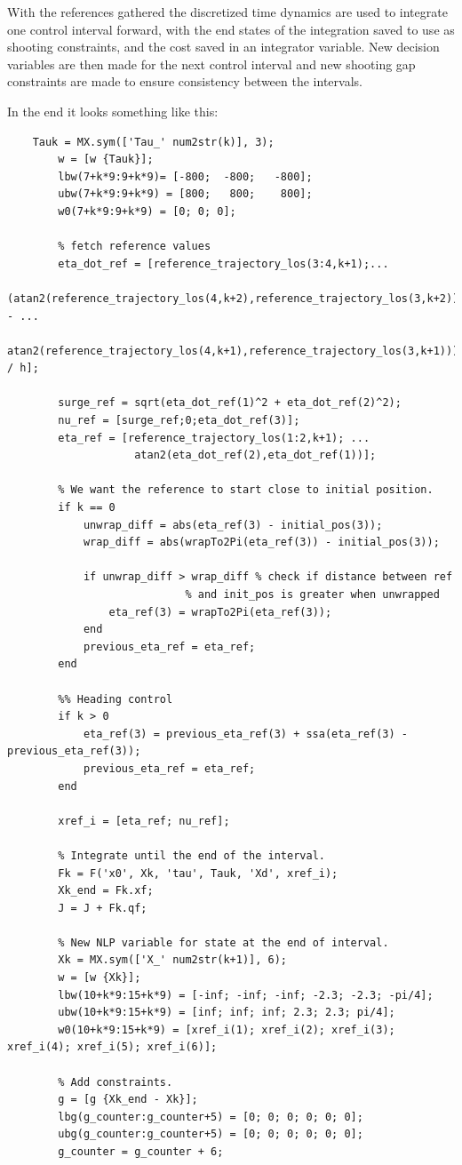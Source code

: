 With the references gathered the discretized time dynamics are used to integrate one control interval forward, with the end states of the integration
saved to use as shooting constraints, and the cost saved in an integrator variable. New decision variables are then made for the next control interval and
new shooting gap constraints are made to ensure consistency between the intervals.

In the end it looks something like this:
\begin{lstlisting}
    Tauk = MX.sym(['Tau_' num2str(k)], 3);
        w = [w {Tauk}];
        lbw(7+k*9:9+k*9)= [-800;  -800;   -800];
        ubw(7+k*9:9+k*9) = [800;   800;    800];
        w0(7+k*9:9+k*9) = [0; 0; 0];
        
        % fetch reference values
        eta_dot_ref = [reference_trajectory_los(3:4,k+1);...
                  (atan2(reference_trajectory_los(4,k+2),reference_trajectory_los(3,k+2)) - ...
                   atan2(reference_trajectory_los(4,k+1),reference_trajectory_los(3,k+1))) / h];
        
        surge_ref = sqrt(eta_dot_ref(1)^2 + eta_dot_ref(2)^2);
        nu_ref = [surge_ref;0;eta_dot_ref(3)];     
        eta_ref = [reference_trajectory_los(1:2,k+1); ...
                    atan2(eta_dot_ref(2),eta_dot_ref(1))]; 

        % We want the reference to start close to initial position.
        if k == 0
            unwrap_diff = abs(eta_ref(3) - initial_pos(3));
            wrap_diff = abs(wrapTo2Pi(eta_ref(3)) - initial_pos(3));

            if unwrap_diff > wrap_diff % check if distance between ref 
                            % and init_pos is greater when unwrapped
                eta_ref(3) = wrapTo2Pi(eta_ref(3));
            end
            previous_eta_ref = eta_ref;
        end
        
        %% Heading control
        if k > 0
            eta_ref(3) = previous_eta_ref(3) + ssa(eta_ref(3) - previous_eta_ref(3));
            previous_eta_ref = eta_ref; 
        end            

        xref_i = [eta_ref; nu_ref];
        
        % Integrate until the end of the interval.
        Fk = F('x0', Xk, 'tau', Tauk, 'Xd', xref_i);
        Xk_end = Fk.xf;
        J = J + Fk.qf;
        
        % New NLP variable for state at the end of interval.
        Xk = MX.sym(['X_' num2str(k+1)], 6);
        w = [w {Xk}];
        lbw(10+k*9:15+k*9) = [-inf; -inf; -inf; -2.3; -2.3; -pi/4];
        ubw(10+k*9:15+k*9) = [inf; inf; inf; 2.3; 2.3; pi/4];
        w0(10+k*9:15+k*9) = [xref_i(1); xref_i(2); xref_i(3); xref_i(4); xref_i(5); xref_i(6)];
        
        % Add constraints.
        g = [g {Xk_end - Xk}];
        lbg(g_counter:g_counter+5) = [0; 0; 0; 0; 0; 0];
        ubg(g_counter:g_counter+5) = [0; 0; 0; 0; 0; 0];
        g_counter = g_counter + 6;
\end{lstlisting}

